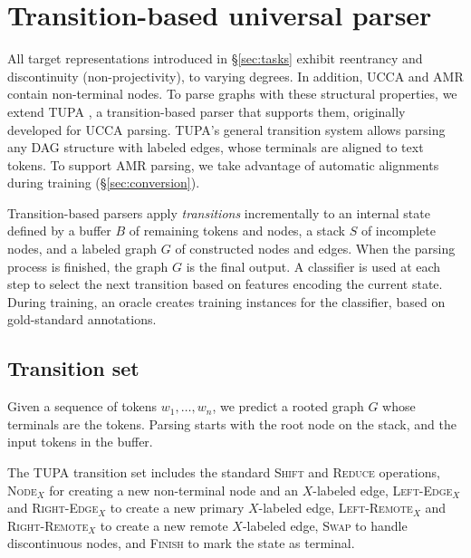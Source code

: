 \documentclass[11pt,a4paper]{article}
\begin{document}
\section{Transition-based universal parser}\label{sec:model}

All target representations introduced in \S\ref{sec:tasks} exhibit
reentrancy and discontinuity (non-projectivity), to varying degrees.
In addition, UCCA and AMR contain non-terminal nodes.
To parse graphs with these structural properties,
we extend TUPA \cite{hershcovich2017a},
a transition-based parser that supports them,
originally developed for UCCA parsing.
TUPA's general transition system allows parsing any DAG structure with labeled edges,
whose terminals are aligned to text tokens.
To support AMR parsing, we take advantage of automatic alignments during training
(\S\ref{sec:conversion}).

Transition-based parsers \cite{Nivre03anefficient} apply \textit{transitions}
incrementally to an internal state defined by
a buffer $B$ of remaining tokens and nodes,
a stack $S$ of incomplete nodes,
and a labeled graph $G$ of constructed nodes and edges.
When the parsing process is finished, the graph $G$ is the final output.
A classifier is used at each step to select the next transition based on features
encoding the current state.
During training, an oracle creates training instances for the classifier,
based on gold-standard annotations.


\subsection{Transition set}\label{sec:transition_set}
Given a sequence of tokens $w_1, \ldots, w_n$,
we predict a rooted graph $G$ whose terminals are the tokens.
Parsing starts with the root node on the stack,
and the input tokens in the buffer.

The TUPA transition set includes
the standard \textsc{Shift} and \textsc{Reduce} operations,
\textsc{Node$_X$} for creating a new non-terminal node and an $X$-labeled edge,
\textsc{Left-Edge$_X$} and \textsc{Right-Edge$_X$} to create a new primary $X$-labeled edge,
\textsc{Left-Remote$_X$} and \textsc{Right-Remote$_X$} to create a new remote $X$-labeled edge,
\textsc{Swap} to handle discontinuous nodes,
and \textsc{Finish} to mark the state as terminal.
\end{document}
